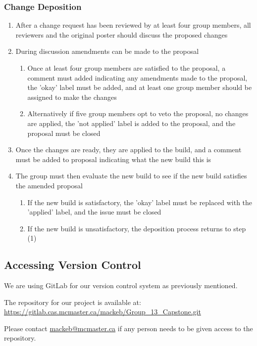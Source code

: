 \documentclass[10pt,letterpaper]{article}
\begin{document}
\subsubsection{Change Deposition}
\begin{enumerate}
	\item After a change request has been reviewed by at least four group members, all reviewers and the original poster should discuss the proposed changes
	\item During discussion amendments can be made to the proposal
	\begin{enumerate}
		\item Once at least four group members are satisfied to the proposal, a comment must added indicating any amendments made to the proposal, the 'okay' label must be added, and at least one group member should be assigned to make the changes
		\item Alternatively if five group members opt to veto the proposal, no changes are applied, the 'not applied' label is added to the proposal, and the proposal must be closed
	\end{enumerate}
	\item Once the changes are ready, they are applied to the build, and a comment must be added to proposal indicating what the new build this is
	\item The group must then evaluate the new build to see if the new build satisfies the amended proposal
	\begin{enumerate}
		\item If the new build is satisfactory, the 'okay' label must be replaced with the 'applied' label, and the issue must be closed
		\item If the new build is unsatisfactory, the deposition process returns to step (1)
	\end{enumerate}
\end{enumerate}

\subsection{Accessing Version Control}
We are using GitLab for our version control system as previously mentioned. \par 
The repository for our project is available at: \\ \url{https://gitlab.cas.mcmaster.ca/mackeb/Group_13_Capstone.git} \par 
Please contact \url{mackeb@mcmaster.ca} if any person needs to be given access to the repository. 
\end{document}
